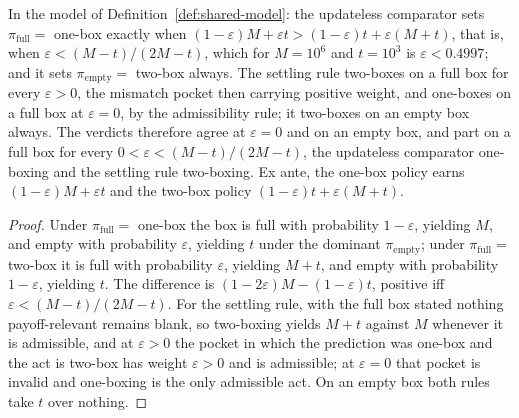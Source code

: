 \begin{proposition}\label{prop:shared-model}
In the model of Definition~\ref{def:shared-model}: the updateless comparator sets $\pi_{\mathrm{full}} = $ one-box exactly when $(1 - \varepsilon) M + \varepsilon t > (1 - \varepsilon) t + \varepsilon (M + t)$, that is, when $\varepsilon < (M - t)/(2M - t)$, which for $M = 10^{6}$ and $t = 10^{3}$ is $\varepsilon < 0.4997$; and it sets $\pi_{\mathrm{empty}} = $ two-box always. The settling rule two-boxes on a full box for every $\varepsilon > 0$, the mismatch pocket then carrying positive weight, and one-boxes on a full box at $\varepsilon = 0$, by the admissibility rule; it two-boxes on an empty box always. The verdicts therefore agree at $\varepsilon = 0$ and on an empty box, and part on a full box for every $0 < \varepsilon < (M - t)/(2M - t)$, the updateless comparator one-boxing and the settling rule two-boxing. Ex ante, the one-box policy earns $(1 - \varepsilon) M + \varepsilon t$ and the two-box policy $(1 - \varepsilon) t + \varepsilon (M + t)$.
\end{proposition}
\begin{proof}
Under $\pi_{\mathrm{full}} = $ one-box the box is full with probability $1 - \varepsilon$, yielding $M$, and empty with probability $\varepsilon$, yielding $t$ under the dominant $\pi_{\mathrm{empty}}$; under $\pi_{\mathrm{full}} = $ two-box it is full with probability $\varepsilon$, yielding $M + t$, and empty with probability $1 - \varepsilon$, yielding $t$. The difference is $(1 - 2\varepsilon) M - (1 - \varepsilon) t$, positive iff $\varepsilon < (M - t)/(2M - t)$. For the settling rule, with the full box stated nothing payoff-relevant remains blank, so two-boxing yields $M + t$ against $M$ whenever it is admissible, and at $\varepsilon > 0$ the pocket in which the prediction was one-box and the act is two-box has weight $\varepsilon > 0$ and is admissible; at $\varepsilon = 0$ that pocket is invalid and one-boxing is the only admissible act. On an empty box both rules take $t$ over nothing.
\end{proof}

